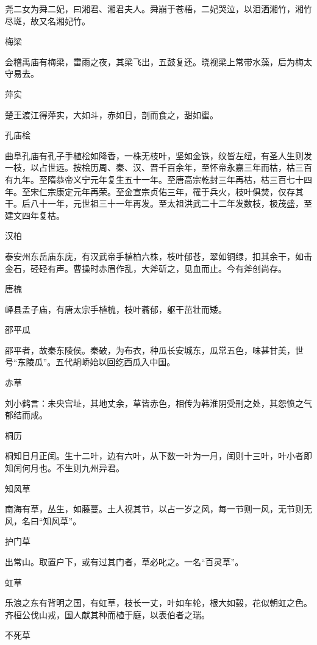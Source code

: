 \documentclass[a4paper,12pt,UTF8,twoside]{ctexbook}
\begin{document}
    尧二女为舜二妃，曰湘君、湘君夫人。舜崩于苍梧，二妃哭泣，以泪洒湘竹，湘竹尽斑，故又名湘妃竹。
    
    梅梁
    
    会稽禹庙有梅梁，雷雨之夜，其梁飞出，五鼓复还。晓视梁上常带水藻，后为梅太守易去。
    
    萍实
    
    楚王渡江得萍实，大如斗，赤如日，剖而食之，甜如蜜。
    
    孔庙桧
    
    曲阜孔庙有孔子手植桧如降香，一株无枝叶，坚如金铁，纹皆左纽，有圣人生则发一枝，以占世远。按桧历周、秦、汉、晋千百余年，至怀帝永嘉三年而枯，枯三百有九年。至隋恭帝义宁元年复生五十一年。至唐高宗乾封三年再枯，枯三百七十四年。至宋仁宗康定元年再荣。至金宣宗贞佑三年，罹于兵火，枝叶俱焚，仅存其干。后八十一年，元世祖三十一年再发。至太祖洪武二十二年发数枝，极茂盛，至建文四年复枯。
    
    汉柏
    
    泰安州东岳庙东庑，有汉武帝手植柏六株，枝叶郁苍，翠如铜绿，扣其余干，如击金石，硁硁有声。曹操时赤眉作乱，大斧斫之，见血而止。今有斧创尚存。
    
    唐槐
    
    峄县孟子庙，有唐太宗手植槐，枝叶蓊郁，躯干茁壮而矮。
    
    邵平瓜
    
    邵平者，故秦东陵侯。秦破，为布衣，种瓜长安城东，瓜常五色，味甚甘美，世号“东陵瓜”。五代胡峤始以回纥西瓜入中国。
    
    赤草
    
    刘小鹤言：未央宫址，其地丈余，草皆赤色，相传为韩淮阴受刑之处，其怨愤之气郁结而成。
    
    桐历
    
    桐知日月正闰。生十二叶，边有六叶，从下数一叶为一月，闰则十三叶，叶小者即知闰何月也。不生则九州异君。
    
    知风草
    
    南海有草，丛生，如藤蔓。土人视其节，以占一岁之风，每一节则一风，无节则无风，名曰“知风草”。
    
    护门草
    
    出常山。取置户下，或有过其门者，草必叱之。一名“百灵草”。
    
    虹草
    
    乐浪之东有背明之国，有虹草，枝长一丈，叶如车轮，根大如毂，花似朝虹之色。齐桓公伐山戎，国人献其种而植于庭，以表伯者之瑞。
    
    不死草
    
\end{document}
